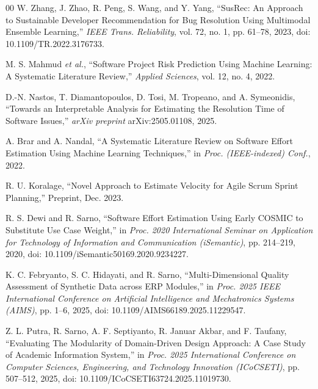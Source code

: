 \documentclass[conference]{IEEEtran}
\begin{document}
\begin{thebibliography}{00}
W. Zhang, J. Zhao, R. Peng, S. Wang, and Y. Yang,
``SusRec: An Approach to Sustainable Developer Recommendation for Bug Resolution Using Multimodal Ensemble Learning,''
\textit{IEEE Trans. Reliability}, vol. 72, no. 1, pp. 61--78, 2023,
doi: 10.1109/TR.2022.3176733.


M. S. Mahmud \textit{et al.}, ``Software Project Risk Prediction Using Machine Learning: A Systematic Literature Review,''
\textit{Applied Sciences}, vol. 12, no. 4, 2022.

D.-N. Nastos, T. Diamantopoulos, D. Tosi, M. Tropeano, and A. Symeonidis,
``Towards an Interpretable Analysis for Estimating the Resolution Time of Software Issues,''
\textit{arXiv preprint} arXiv:2505.01108, 2025.

A. Brar and A. Nandal,
``A Systematic Literature Review on Software Effort Estimation Using Machine Learning Techniques,''
in \textit{Proc. (IEEE-indexed) Conf.}, 2022.

R. U. Koralage, ``Novel Approach to Estimate Velocity for Agile Scrum Sprint Planning,''
Preprint, Dec. 2023.

R. S. Dewi and R. Sarno, ``Software Effort Estimation Using Early COSMIC to Substitute Use Case Weight,''
in \textit{Proc. 2020 International Seminar on Application for Technology of Information and Communication (iSemantic)},
pp. 214--219, 2020, doi: 10.1109/iSemantic50169.2020.9234227.

K. C. Febryanto, S. C. Hidayati, and R. Sarno, ``Multi-Dimensional Quality Assessment of Synthetic Data across ERP Modules,''
in \textit{Proc. 2025 IEEE International Conference on Artificial Intelligence and Mechatronics Systems (AIMS)},
pp. 1--6, 2025, doi: 10.1109/AIMS66189.2025.11229547.

Z. L. Putra, R. Sarno, A. F. Septiyanto, R. Januar Akbar, and F. Taufany,
``Evaluating The Modularity of Domain-Driven Design Approach: A Case Study of Academic Information System,''
in \textit{Proc. 2025 International Conference on Computer Sciences, Engineering, and Technology Innovation (ICoCSETI)},
pp. 507--512, 2025, doi: 10.1109/ICoCSETI63724.2025.11019730.

\end{thebibliography}
\end{document}
